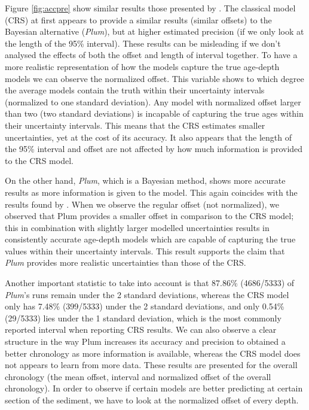 \documentclass [10pt] {article}
\begin{document}
Figure \ref{fig:accpre} show similar results those presented by \citet{Blaauw2018}. 
The classical model (CRS) at first appears to provide a similar results (similar offsets) to the Bayesian alternative (\textit{Plum}), but at higher estimated precision (if we only look at the length of the 95\% interval). 
These results can be misleading if we don't analysed the effects of both the offset and length of interval together. 
To have a more realistic representation of how the models capture the true age-depth models we can observe the normalized offset. 
This variable shows to which degree the average models contain the truth within their uncertainty intervals (normalized to one standard deviation). 
Any model with normalized offset larger than two (two standard deviations) is incapable of capturing the true ages within their uncertainty intervals.  
This means that the CRS estimates smaller uncertainties, yet at the cost of its accuracy.
It also appears that the length of the 95\% interval and offset are not affected by how much information is provided to the CRS model. 

On the other hand, \textit{Plum}, which is a Bayesian method, shows more accurate results as more information is given to the model.
This again coincides with the results found by \citet{Blaauw2018}. 
When we observe the regular offset (not normalized), we observed that Plum provides a smaller offset in comparison to the CRS model; this in combination with slightly larger modelled uncertainties results in consistently accurate age-depth models which are capable of capturing the true values within their uncertainty intervals. 
This result supports the claim that \textit{Plum} provides more realistic uncertainties than those of the CRS. 



	Another important statistic to take into account is that 87.86\% (4686/5333) of \textit{Plum}'s runs remain under the 2 standard deviations, whereas the CRS model only has 7.48\% (399/5333) under the 2 standard deviations, and only 0.54\% (29/5333) lies under the 1 standard deviation, which is the most commonly reported interval when reporting CRS results.
We can also observe a clear structure in the way Plum increases its accuracy and precision to obtained a better chronology as more information is available, whereas the CRS model does not appears to learn from more data. 
These results are presented for the overall chronology (the mean offset, interval and normalized offset of the overall chronology). 
In order to observe if certain models are better predicting at certain section of the sediment, we have to look at the normalized offset of every depth. 
\end{document}
